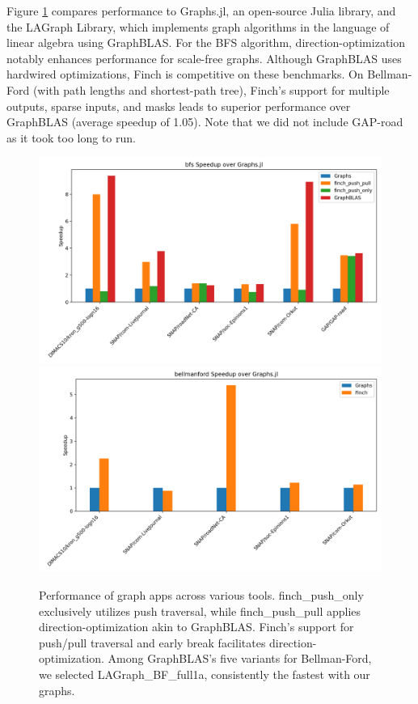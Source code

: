 Figure \ref{fig:graph_result} compares performance to Graphs.jl, an open-source Julia library, and the LAGraph Library, which implements graph algorithms in the language of linear algebra using GraphBLAS\cite{mattson2019lagraph}. For the BFS algorithm, direction-optimization notably enhances performance for scale-free graphs. Although GraphBLAS uses hardwired optimizations, Finch is competitive on these benchmarks. On Bellman-Ford (with path lengths and shortest-path tree), Finch's support for multiple outputs, sparse inputs, and masks leads to superior performance over GraphBLAS (average speedup of 1.05). Note that we did not include GAP-road as it took too long to run.
 
\begin{figure}
	\includegraphics[width=0.5\linewidth]{bfs_speedup_over_graphs.jl.png}%
	\includegraphics[width=0.5\linewidth]{bellmanford_speedup_over_graphs.jl.png}
    \caption{Performance of graph apps across various tools. finch\_push\_only exclusively utilizes push traversal, while finch\_push\_pull applies direction-optimization akin to GraphBLAS. Finch's support for push/pull traversal and early break facilitates direction-optimization. Among GraphBLAS's five variants for Bellman-Ford, we selected LAGraph\_BF\_full1a, consistently the fastest with our graphs.}
     \label{fig:graph_result}
\end{figure}

